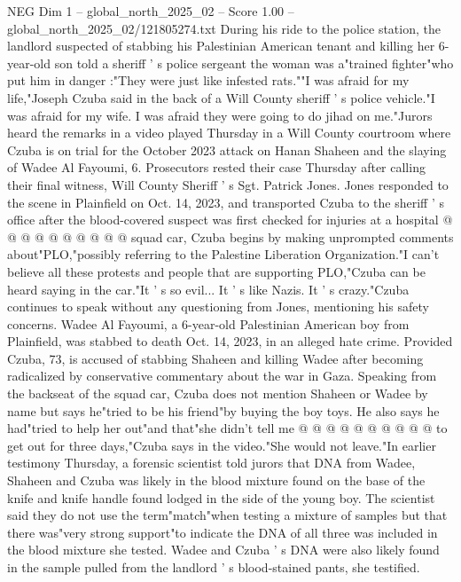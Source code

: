 \begin{textsample}{NEG Dim 1 – global\_north\_2025\_02 – Score 1.00 – global\_north\_2025\_02/121805274.txt}  \label{ex:f1_neg_012}
During his ride to the police station, the landlord suspected of stabbing his Palestinian American tenant and killing her 6-year-old son told a sheriff ' s police sergeant the woman was a"trained fighter"who put him in danger :"They were just like infested rats.""I was afraid for my life,"Joseph Czuba said in the back of a Will County sheriff ' s police vehicle."I was afraid for my wife.
I was afraid they were going to do jihad on me."Jurors heard the remarks in a video played Thursday in a Will County courtroom where Czuba is on trial for the October 2023 attack on Hanan Shaheen and the slaying of Wadee Al Fayoumi, 6.
Prosecutors rested their case Thursday after calling their final witness, Will County Sheriff ' s Sgt.
Patrick Jones.
Jones responded to the scene in Plainfield on Oct. 14, 2023, and transported Czuba to the sheriff ' s office after the blood-covered suspect was first checked for injuries at a hospital @ @ @ @ @ @ @ @ @ @ squad car, Czuba begins by making unprompted comments about"PLO,"possibly referring to the Palestine Liberation Organization."I can't believe all these protests and people that are supporting PLO,"Czuba can be heard saying in the car."It ' s so evil...
It ' s like Nazis.
It ' s crazy."Czuba continues to speak without any questioning from Jones, mentioning his safety concerns.
Wadee Al Fayoumi, a 6-year-old Palestinian American boy from Plainfield, was stabbed to death Oct. 14, 2023, in an alleged hate crime.
Provided Czuba, 73, is accused of stabbing Shaheen and killing Wadee after becoming radicalized by conservative commentary about the war in Gaza.
Speaking from the backseat of the squad car, Czuba does not mention Shaheen or Wadee by name but says he"tried to be his friend"by buying the boy toys.
He also says he had"tried to help her out"and that"she didn't tell me @ @ @ @ @ @ @ @ @ @ to get out for three days,"Czuba says in the video."She would not leave."In earlier testimony Thursday, a forensic scientist told jurors that DNA from Wadee, Shaheen and Czuba was likely in the blood mixture found on the base of the knife and knife handle found lodged in the side of the young boy.
The scientist said they do not use the term"match"when testing a mixture of samples but that there was"very strong support"to indicate the DNA of all three was included in the blood mixture she tested.
Wadee and Czuba ' s DNA were also likely found in the sample pulled from the landlord ' s blood-stained pants, she testified.

\end{textsample}
